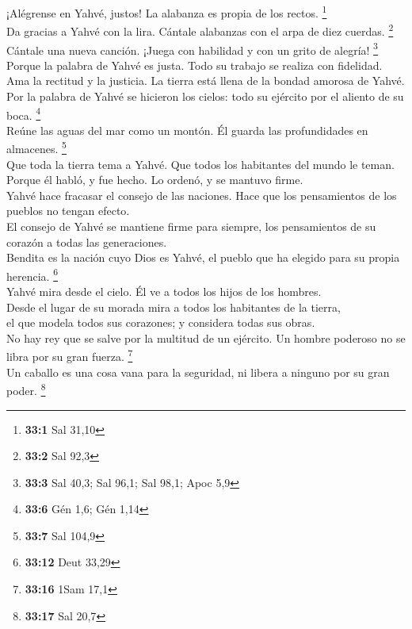  ¡Alégrense en Yahvé, justos! La alabanza es propia de los
rectos. \footnote{\textbf{33:1} Sal 31,10}\\
 Da gracias a Yahvé con la lira. Cántale alabanzas con el
arpa de diez cuerdas. \footnote{\textbf{33:2} Sal 92,3}\\
 Cántale una nueva canción. ¡Juega con habilidad y con un
grito de alegría! \footnote{\textbf{33:3} Sal 40,3; Sal 96,1; Sal 98,1;
  Apoc 5,9}\\
 Porque la palabra de Yahvé es justa. Todo su trabajo se
realiza con fidelidad.\\
 Ama la rectitud y la justicia. La tierra está llena de la
bondad amorosa de Yahvé.\\
 Por la palabra de Yahvé se hicieron los cielos: todo su
ejército por el aliento de su boca. \footnote{\textbf{33:6} Gén 1,6; Gén
  1,14}\\
 Reúne las aguas del mar como un montón. Él guarda las
profundidades en almacenes. \footnote{\textbf{33:7} Sal 104,9}\\
 Que toda la tierra tema a Yahvé. Que todos los habitantes
del mundo le teman.\\
 Porque él habló, y fue hecho. Lo ordenó, y se mantuvo
firme.\\
 Yahvé hace fracasar el consejo de las naciones. Hace que
los pensamientos de los pueblos no tengan efecto.\\
 El consejo de Yahvé se mantiene firme para siempre, los
pensamientos de su corazón a todas las generaciones.\\
 Bendita es la nación cuyo Dios es Yahvé, el pueblo que
ha elegido para su propia herencia. \footnote{\textbf{33:12} Deut 33,29}\\
 Yahvé mira desde el cielo. Él ve a todos los hijos de
los hombres.\\
 Desde el lugar de su morada mira a todos los habitantes
de la tierra,\\
 el que modela todos sus corazones; y considera todas sus
obras.\\
 No hay rey que se salve por la multitud de un ejército.
Un hombre poderoso no se libra por su gran fuerza. \footnote{\textbf{33:16}
  1Sam 17,1}\\
 Un caballo es una cosa vana para la seguridad, ni libera
a ninguno por su gran poder. \footnote{\textbf{33:17} Sal 20,7}\\
